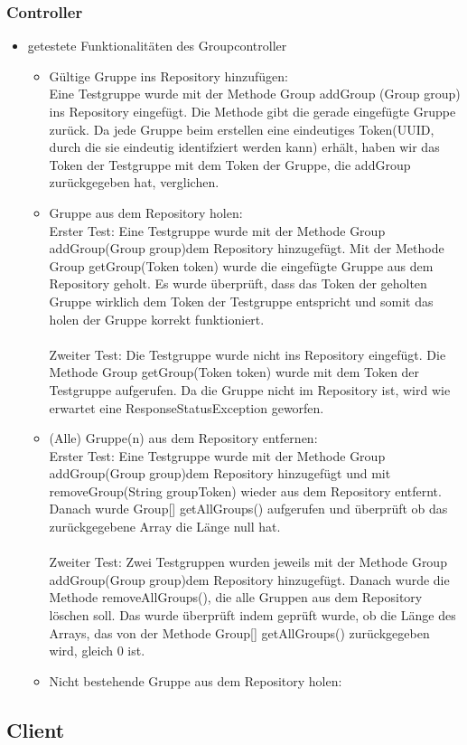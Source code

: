 \documentclass[a4paper]{scrreprt}
\begin{document}
\subsubsection{Controller}
\begin{itemize}
	\item \b getestete Funktionalitäten des Groupcontroller
	\begin{itemize}
		\item {Gültige Gruppe ins Repository hinzufügen: \\
		Eine Testgruppe wurde mit der Methode Group addGroup (Group group) ins Repository eingefügt. Die Methode gibt die gerade eingefügte Gruppe zurück.
Da jede Gruppe beim erstellen eine eindeutiges Token(UUID, durch die sie eindeutig identifziert werden kann) erhält, haben wir das Token der Testgruppe mit dem Token der Gruppe, die addGroup zurückgegeben hat, verglichen.		
		}
		
		\item {Gruppe aus dem Repository holen: \\
		Erster Test: Eine Testgruppe wurde mit der Methode Group addGroup(Group group)dem Repository hinzugefügt. Mit der Methode Group getGroup(Token token) wurde die eingefügte Gruppe aus dem Repository geholt. Es wurde überprüft, dass das Token der geholten Gruppe wirklich dem Token der Testgruppe entspricht und somit das holen der Gruppe korrekt funktioniert. \\
		\\ Zweiter Test: Die Testgruppe wurde nicht ins Repository eingefügt. Die Methode Group getGroup(Token token) wurde mit dem Token der Testgruppe aufgerufen. Da die Gruppe nicht im Repository ist, wird wie erwartet eine ResponseStatusException geworfen. }
		
		\item {(Alle) Gruppe(n) aus dem Repository entfernen: \\
		Erster Test: Eine Testgruppe wurde mit der Methode Group addGroup(Group group)dem Repository hinzugefügt und mit removeGroup(String groupToken) wieder aus dem Repository entfernt. Danach wurde Group[] getAllGroups() aufgerufen und überprüft ob das zurückgegebene Array die Länge null hat. \\
		\\ Zweiter Test: Zwei Testgruppen wurden jeweils mit der Methode Group addGroup(Group group)dem Repository hinzugefügt. Danach wurde die Methode removeAllGroups(), die alle Gruppen aus dem Repository löschen soll. Das wurde überprüft indem geprüft wurde, ob die Länge des Arrays, das von der Methode Group[] getAllGroups() zurückgegeben wird, gleich 0 ist.
		}
		
		\item {Nicht bestehende Gruppe aus dem Repository holen: \\
		
		}
		
	\end{itemize}
\end{itemize}


\subsection{Client}


\printglossaries
\end{document}
